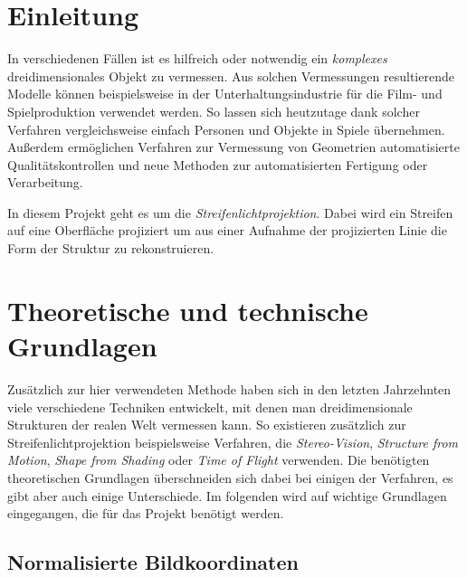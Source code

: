 \documentclass[ngerman,a4paper,parskip=half]{scrartcl}
\begin{document}


\tableofcontents
\newpage


\section{Einleitung}

In verschiedenen Fällen ist es hilfreich oder notwendig ein \emph{komplexes} dreidimensionales Objekt zu vermessen. Aus solchen Vermessungen resultierende Modelle können beispielsweise in der Unterhaltungsindustrie für die Film- und Spielproduktion verwendet werden. So lassen sich heutzutage dank solcher Verfahren vergleichsweise einfach Personen und Objekte in Spiele übernehmen. Außerdem ermöglichen Verfahren zur Vermessung von Geometrien automatisierte Qualitätskontrollen und neue Methoden zur automatisierten Fertigung oder Verarbeitung.

In diesem Projekt geht es um die \emph{Streifenlichtprojektion}. Dabei wird ein Streifen auf eine Oberfläche projiziert um aus einer Aufnahme der projizierten Linie die Form der Struktur zu rekonstruieren.


\section{Theoretische und technische Grundlagen}

Zusätzlich zur hier verwendeten Methode haben sich in den letzten Jahrzehnten viele verschiedene Techniken entwickelt, mit denen man dreidimensionale Strukturen der realen Welt vermessen kann. So existieren zusätzlich zur Streifenlichtprojektion beispielsweise Verfahren, die \emph{Stereo-Vision}, \emph{Structure from Motion}, \emph{Shape from Shading} oder \emph{Time of Flight} verwenden. Die benötigten theoretischen Grundlagen überschneiden sich dabei bei einigen der Verfahren, es gibt aber auch einige Unterschiede. Im folgenden wird auf wichtige Grundlagen eingegangen, die für das Projekt benötigt werden.

\subsection{Normalisierte Bildkoordinaten}
\label{sec:imagecoordinates}
\end{document}
